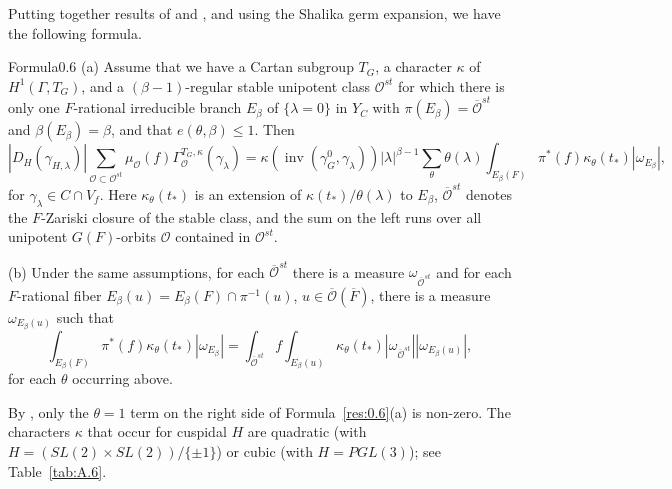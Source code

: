 \documentclass[12pt,letterpaper]{amsart}
\theoremstyle{plain}
\theoremstyle{definition}
\theoremstyle{remark}
\theoremstyle{definition}
\DeclareMathOperator{\inv}{inv}
\begin{document}
Putting together results of \cite{La83} and \cite[\S 2]{Ha89},
and using the Shalika germ expansion, we
have the following formula.

\begin{res}{Formula}{0.6}\label{res:0.6}
\textup{(a)} Assume that we have a Cartan subgroup $T_G$, a character
$\kappa$ of $H^1(\Gamma,T_G)$, and
a $(\beta-1)$-regular
stable unipotent class ${\mathcal O}^{st}$ for which there is only
one $F$-rational irreducible branch $E_\beta$ of $\{\lambda =0\}$ in
$Y_C$ with $\pi(E_\beta)=\overline{{\mathcal O}}^{st}$ and
$\beta(E_\beta)=\beta$, and that $e(\theta,\beta)\le1$. Then
\[
|D_H(\gamma_{H,\lambda})|
\sum_{{\mathcal O}\subset {\mathcal O}^{st}}
\mu_{{\mathcal O}}(f)\Gamma_{{\mathcal O}}^{T_G,\kappa}(\gamma_\lambda)
=\kappa(\inv(\gamma_G^0,\gamma_\lambda))
|\lambda|^{\beta -1}\sum_{\theta}\theta(\lambda)
\int_{E_\beta(F)} \pi^*(f)\kappa_\theta(t_*)|\omega_{E_\beta}|,
\]
for $\gamma_\lambda\in C\cap V_f$. Here $\kappa_\theta(t_*)$
is an extension of $\kappa(t_*)/\theta(\lambda)$ to
$E_\beta$, $\overline{{\mathcal O}}^{st}$ denotes the $F$-Zariski closure
of the stable class, and the sum on the left runs over all
unipotent $G(F)$-orbits ${\mathcal O}$ contained in
${\mathcal O}^{st}$.

\textup{(b)} Under the same assumptions, for each $\overline{\mathcal O}^{st}$
there is a measure $\omega_{\overline{\mathcal O}^{st}}$ and for each
$F$-rational fiber
$E_\beta(u)=E_\beta(F)\cap \pi^{-1}(u)$,
$u\in \overline{\mathcal O}(\overline{F})$,
there is a measure
$\omega_{E_\beta(u)}$ such that
\[
\int_{E_\beta(F)} \pi^*(f)\kappa_\theta(t_*)|\omega_{E_\beta}|
=\int_{\overline{\mathcal O}^{st}}f\int_{E_\beta(u)} \kappa_\theta(t_*)
|\omega_{\overline{\mathcal O}^{st}}||\omega_{E_\beta(u)}|,
\]
for each $\theta$ occurring above.
\end{res}

By \cite[ch.~6, \S 2]{Ha92a}, only the $\theta =1$
term on the right side of Formula~\ref{res:0.6}(a) is non-zero.
The characters $\kappa$ that occur for cuspidal $H$ are
quadratic (with $H=(SL(2)\times SL(2))/\{\pm 1\}$)
or cubic (with $H=PGL(3)$); see Table~\ref{tab:A.6}.
\end{document}
